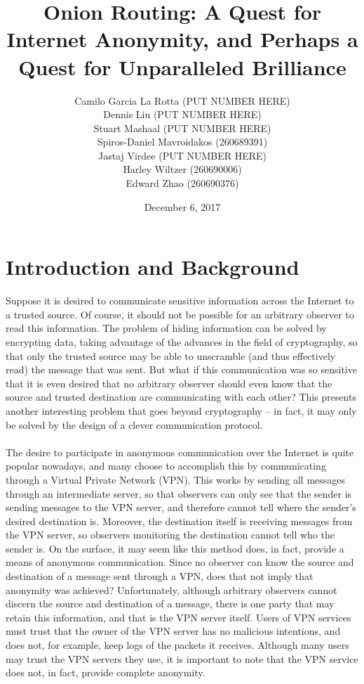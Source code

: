 \documentclass[10pt]{report}
\title{Onion Routing: A Quest for Internet Anonymity, and Perhaps a Quest for Unparalleled
Brilliance}
\author{Camilo Garcia La Rotta (PUT NUMBER HERE)\\Dennis Liu (PUT NUMBER HERE)\\Stuart
Mashaal (PUT NUMBER HERE)\\Spiros-Daniel
Mavroidakos (260689391)\\Jastaj Virdee (PUT NUMBER HERE)\\Harley Wiltzer (260690006)\\Edward Zhao
(260690376)}
\date{December 6, 2017}
\begin{document}
\maketitle
\tableofcontents
\doublespacing
\chapter{Introduction and Background}
Suppose it is desired to communicate sensitive information across the Internet to a trusted source.
Of course, it should not be possible for an arbitrary observer to read this information. The problem
of hiding information can be solved by encrypting data, taking advantage of the advances in the
field of cryptography, so that only the trusted source may be able to unscramble (and thus
effectively read) the message that was sent. But what if this communication was so sensitive that it
is even desired that no arbitrary observer should even know that the source and trusted destination
are communicating with each other? This presents another interesting problem that goes beyond
cryptography -- in fact, it may only be solved by the design of a clever communication protocol.\\\\
The desire to participate in anonymous communication over the Internet is quite popular nowadays,
and many choose to accomplish this by communicating through a Virtual Private Network (VPN). This
works by sending all messages through an intermediate server, so that observers can only see that
the sender is sending messages to the VPN server, and therefore cannot tell where the sender's
desired destination is. Moreover, the destination itself is receiving messages from the VPN server,
so observers monitoring the destination cannot tell who the sender is. On the surface, it may seem
like this method does, in fact, provide a means of anonymous communication. Since no observer can
know the source and destination of a message sent through a VPN, does that not imply that anonymity
was achieved? Unfortunately, although arbitrary observers cannot discern the source and destination
of a message, there is one party that may retain this information, and that is the VPN
server itself. Users of VPN services must trust that the owner of the VPN server has no malicious
intentions, and does not, for example, keep logs of the packets it receives. Although many users may
trust the VPN servers they use, it is important to note that the VPN service does not, in fact,
provide complete anonymity.\\\\
\end{document}
